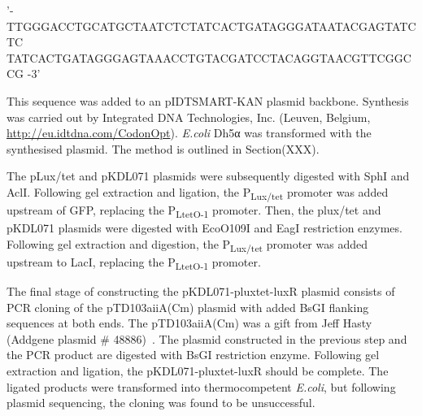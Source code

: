 \vspace{3 mm}
'- TTGGGACCTGCATGCTAATCTCTATCACTGATAGGGATAATACGAGTATCTC\\TATCACTGATAGGGAGTAAACCTGTACGATCCTACAGGTAACGTTCGGCCG -3'
\vspace{3 mm}

This sequence was added to an pIDTSMART-KAN plasmid backbone. Synthesis was carried out by Integrated DNA Technologies, Inc. (Leuven, Belgium, \url{http://eu.idtdna.com/CodonOpt}). \textit{E.coli} Dh5α was transformed with the synthesised plasmid. The method is outlined in Section(XXX).

The pLux/tet and pKDL071 plasmids were subsequently digested with SphI and AclI. Following gel extraction and ligation, the P\textsubscript{Lux/tet} promoter was added upstream of GFP, replacing the P\textsubscript{LtetO-1} promoter. Then, the plux/tet and pKDL071 plasmids were  digested with EcoO109I and EagI restriction enzymes. Following gel extraction and digestion, the P\textsubscript{Lux/tet} promoter was added upstream to LacI, replacing the P\textsubscript{LtetO-1} promoter. 


The final stage of constructing the pKDL071-pluxtet-luxR plasmid consists of PCR cloning of the pTD103aiiA(Cm) plasmid with added BsGI flanking sequences at both ends. The pTD103aiiA(Cm) was a gift from Jeff Hasty (Addgene plasmid \# 48886)~\autocite{Prindle:2012cj}. The plasmid constructed in the previous step and the PCR product are digested with BsGI restriction enzyme. Following gel extraction and ligation, the pKDL071-pluxtet-luxR should be complete. The ligated products were transformed into thermocompetent \textit{E.coli}, but following plasmid sequencing, the cloning was found to be unsuccessful. 




